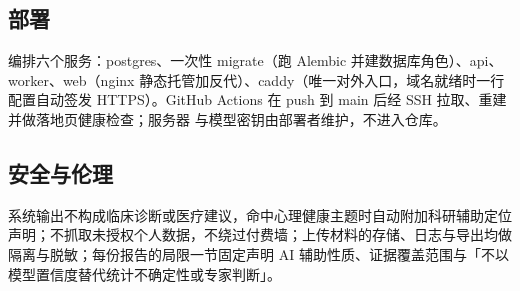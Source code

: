 \subsection{部署}

 编排六个服务：postgres、一次性 migrate（跑 Alembic 并建数据库角色）、api、worker、web（nginx 静态托管加反代）、caddy（唯一对外入口，域名就绪时一行配置自动签发 HTTPS）。GitHub Actions 在 push 到 main 后经 SSH 拉取、重建并做落地页健康检查；服务器  与模型密钥由部署者维护，不进入仓库。

\subsection{安全与伦理}

系统输出不构成临床诊断或医疗建议，命中心理健康主题时自动附加科研辅助定位声明；不抓取未授权个人数据，不绕过付费墙；上传材料的存储、日志与导出均做隔离与脱敏；每份报告的局限一节固定声明 AI 辅助性质、证据覆盖范围与「不以模型置信度替代统计不确定性或专家判断」。

